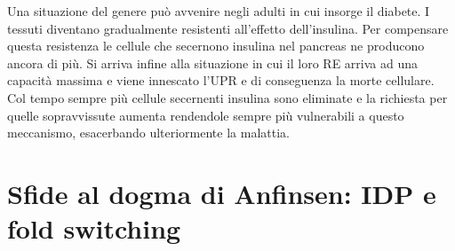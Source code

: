 {{\par Una situazione del genere può avvenire negli adulti in cui insorge il diabete. I tessuti diventano gradualmente resistenti all'effetto dell'insulina. Per compensare questa resistenza le cellule che secernono insulina nel pancreas ne producono ancora di più. Si arriva infine alla situazione in cui il loro RE arriva ad una capacità massima e viene innescato l'UPR e di conseguenza la morte cellulare. Col tempo sempre più cellule secernenti insulina sono eliminate e la richiesta per quelle sopravvissute aumenta rendendole sempre più vulnerabili a questo meccanismo, esacerbando ulteriormente la malattia\supercite{alberts2018essential}.
}
}

\section{Sfide al dogma di Anfinsen: IDP e fold switching} \label{sfide-dogma}
